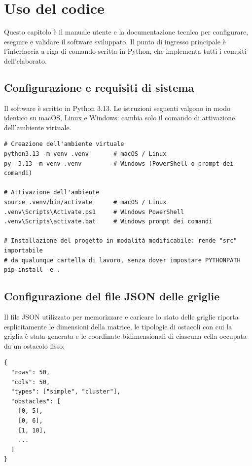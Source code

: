 \section{Uso del codice}

Questo capitolo è il manuale utente e la documentazione tecnica per configurare, eseguire e validare il software sviluppato. Il punto di ingresso principale è l'interfaccia a riga di comando scritta in Python, che implementa tutti i compiti dell'elaborato.

\subsection{Configurazione e requisiti di sistema}

Il software è scritto in Python 3.13. Le istruzioni seguenti valgono in modo identico su macOS, Linux e Windows: cambia solo il comando di attivazione dell'ambiente virtuale.

\begin{lstlisting}[style=comandoshell]
# Creazione dell'ambiente virtuale
python3.13 -m venv .venv       # macOS / Linux
py -3.13 -m venv .venv         # Windows (PowerShell o prompt dei comandi)

# Attivazione dell'ambiente
source .venv/bin/activate      # macOS / Linux
.venv\Scripts\Activate.ps1     # Windows PowerShell
.venv\Scripts\activate.bat     # Windows prompt dei comandi

# Installazione del progetto in modalità modificabile: rende "src" importabile
# da qualunque cartella di lavoro, senza dover impostare PYTHONPATH
pip install -e .
\end{lstlisting}

\subsection{Configurazione del file JSON delle griglie}

Il file JSON utilizzato per memorizzare e caricare lo stato delle griglie riporta esplicitamente le dimensioni della matrice, le tipologie di ostacoli con cui la griglia è stata generata e le coordinate bidimensionali di ciascuna cella occupata da un ostacolo fisso:
\newpage

\begin{verbatim}
{
  "rows": 50,
  "cols": 50,
  "types": ["simple", "cluster"],
  "obstacles": [
    [0, 5],
    [0, 6],
    [1, 10],
    ...
  ]
}
\end{verbatim}

